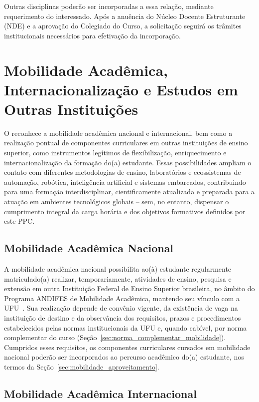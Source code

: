 Outras disciplinas poderão ser incorporadas a essa relação, mediante requerimento do interessado. Após a anuência do Núcleo Docente Estruturante (NDE) e a aprovação do Colegiado do Curso, a solicitação seguirá os trâmites institucionais necessários para efetivação da incorporação.

\section{Mobilidade Acadêmica, Internacionalização e Estudos em Outras Instituições}
\label{sec:mobilidade}

O \ppccurso reconhece a mobilidade acadêmica nacional e internacional, bem como a realização pontual de componentes curriculares em outras instituições de ensino superior, como instrumentos legítimos de flexibilização, enriquecimento e internacionalização da formação do(a) estudante. Essas possibilidades ampliam o contato com diferentes metodologias de ensino, laboratórios e ecossistemas de automação, robótica, inteligência artificial e sistemas embarcados, contribuindo para uma formação interdisciplinar, cientificamente atualizada e preparada para a atuação em ambientes tecnológicos globais -- sem, no entanto, dispensar o cumprimento integral da carga horária e dos objetivos formativos definidos por este PPC.

\subsection{Mobilidade Acadêmica Nacional}

A mobilidade acadêmica nacional possibilita ao(à) estudante regularmente matriculado(a) realizar, temporariamente, atividades de ensino, pesquisa e extensão em outra Instituição Federal de Ensino Superior brasileira, no âmbito do Programa ANDIFES de Mobilidade Acadêmica, mantendo seu vínculo com a UFU~\cite{ufu_congrad_08_2004,ufu_congrad_13_2013}. Sua realização depende de convênio vigente, da existência de vaga na instituição de destino e da observância dos requisitos, prazos e procedimentos estabelecidos pelas normas institucionais da UFU e, quando cabível, por norma complementar do curso (Seção~\ref{sec:norma_complementar_mobilidade}). Cumpridos esses requisitos, os componentes curriculares cursados em mobilidade nacional poderão ser incorporados ao percurso acadêmico do(a) estudante, nos termos da Seção~\ref{sec:mobilidade_aproveitamento}.

\subsection{Mobilidade Acadêmica Internacional}

